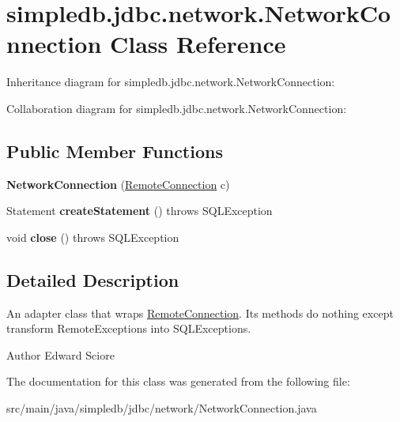 \hypertarget{classsimpledb_1_1jdbc_1_1network_1_1NetworkConnection}{}\section{simpledb.\+jdbc.\+network.\+Network\+Connection Class Reference}
\label{classsimpledb_1_1jdbc_1_1network_1_1NetworkConnection}


Inheritance diagram for simpledb.\+jdbc.\+network.\+Network\+Connection\+:


Collaboration diagram for simpledb.\+jdbc.\+network.\+Network\+Connection\+:
\subsection*{Public Member Functions}
\begin{DoxyCompactItemize}
\item 
\mbox{\label{classsimpledb_1_1jdbc_1_1network_1_1NetworkConnection_ab15da0220d10bc962925aa5a5f97a93e}} 
{\bfseries Network\+Connection} (\hyperlink{interfacesimpledb_1_1jdbc_1_1network_1_1RemoteConnection}{Remote\+Connection} c)
\item 
\mbox{\label{classsimpledb_1_1jdbc_1_1network_1_1NetworkConnection_a3d5d894a69cfab3827bf3056d2bff2de}} 
Statement {\bfseries create\+Statement} ()  throws S\+Q\+L\+Exception 
\item 
\mbox{\label{classsimpledb_1_1jdbc_1_1network_1_1NetworkConnection_a7f183c8680d3ea91defce3773219ecb3}} 
void {\bfseries close} ()  throws S\+Q\+L\+Exception 
\end{DoxyCompactItemize}


\subsection{Detailed Description}
An adapter class that wraps \hyperlink{interfacesimpledb_1_1jdbc_1_1network_1_1RemoteConnection}{Remote\+Connection}. Its methods do nothing except transform Remote\+Exceptions into S\+Q\+L\+Exceptions. \begin{DoxyAuthor}{Author}
Edward Sciore 
\end{DoxyAuthor}


The documentation for this class was generated from the following file\+:\begin{DoxyCompactItemize}
\item 
src/main/java/simpledb/jdbc/network/Network\+Connection.\+java\end{DoxyCompactItemize}

